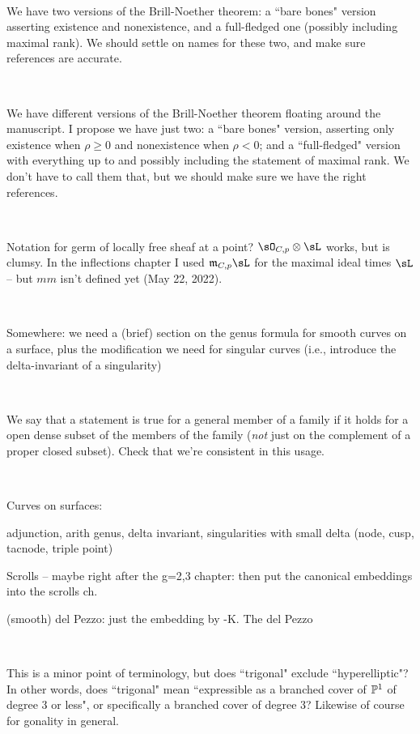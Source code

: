 \documentclass[12pt, leqno]{book}
\begin{document}
\

We have two versions of the Brill-Noether theorem: a ``bare bones" version asserting existence and nonexistence, and a full-fledged one (possibly including maximal rank). We should settle on names for these two, and make sure references are accurate.

\

We have different versions of the Brill-Noether theorem floating around the manuscript. I propose we have just two: a ``bare bones" version, asserting only existence when $\rho \geq 0$ and nonexistence when $\rho < 0$; and a ``full-fledged" version with everything up to and possibly including the statement of maximal rank. We don't have to call them that, but we should make sure we have the right references. 


\ 

Notation for germ of locally free sheaf at a point? $\sO_{C,p}\otimes \sL$ works, but is clumsy. In the inflections chapter I used $\frak{m}_{C,p}\sL$ for the maximal ideal times $\sL$ -- but $mm$ isn't defined yet (May 22, 2022).

\

Somewhere: we need a (brief) section on the genus formula for smooth curves on a surface, plus the modification we need for singular curves (i.e., introduce the delta-invariant of a singularity)

\

We say that a statement is true for a general member of a family if it holds for a open dense subset of the members of the family (\emph{not} just on the complement of a proper closed subset). Check that we're consistent in this usage.

\

Curves on surfaces:

adjunction, arith genus, delta invariant, singularities with small delta (node, cusp, tacnode, triple point)

Scrolls -- maybe right after the g=2,3 chapter:   then put the canonical embeddings into the scrolls ch.

(smooth) del Pezzo: just the embedding by -K. The del Pezzo 

\

This is a minor point of terminology, but does ``trigonal" exclude ``hyperelliptic"? In other words, does ``trigonal" mean ``expressible as a branched cover of $\PP^1$ of degree 3 or less", or specifically a branched cover of degree 3? Likewise of course for gonality in general.
\end{document}
